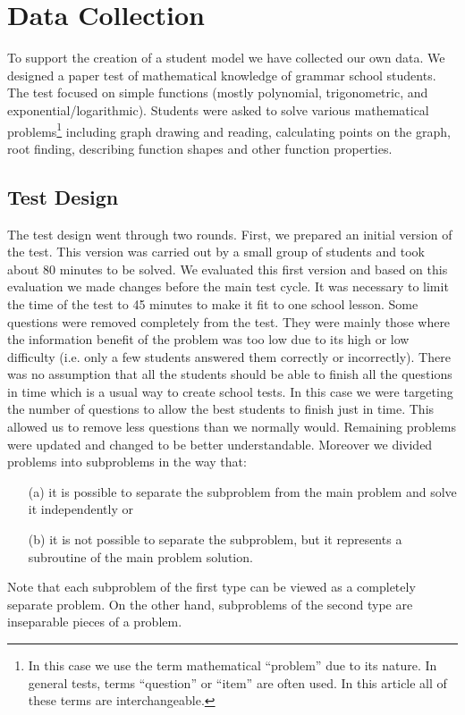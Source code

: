 \chapter{Data Collection}

To support the creation of a student model we have collected our own data. We designed a paper test of mathematical knowledge of grammar school students. The test focused on simple functions (mostly polynomial, trigonometric, and exponential/logarithmic). Students were asked to solve various mathematical problems\footnote{In this case we use the term mathematical ``problem'' due to its nature. In general tests,	 terms ``question'' or ``item'' are often used. In this article all of these terms are interchangeable.} including graph drawing and reading, calculating points on the graph, root finding, describing function shapes and other function properties. 

\section{Test Design}
The test design went through two rounds. First, we prepared an initial version of the test. This version was carried out by a small group of students and took about 80 minutes to be solved. We evaluated this first version and based on this evaluation we made changes before the main test cycle. It was necessary to limit the time of the test to 45 minutes to make it fit to one school lesson. Some questions were removed completely from the test. They were mainly those where the information benefit of the problem was too low due to its high or low difficulty (i.e. only a few students answered them correctly or incorrectly). There was no assumption that all the students should be able to finish all the questions in time which is a usual way to create school tests. In this case we were targeting the number of questions to allow the best students to finish just in time. This allowed us to remove less questions than we normally would. Remaining problems were updated and changed to be better understandable.  Moreover we divided problems into subproblems in the way that: 
\begin{itemize}
\item[(a)] it is possible to separate the subproblem from the main problem and solve it independently or 
\item[(b)] it is not possible to separate the subproblem, but it represents a subroutine of the main problem solution. 
\end{itemize}
Note that each subproblem of the first type can be viewed as a completely separate problem. 
On the other hand, subproblems of the second type are inseparable pieces of a problem.\\


